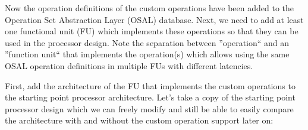 \documentclass[twoside]{tceusermanual}
\begin{document}
% 

Now the operation definitions of the custom operations have been added to the
Operation Set Abstraction Layer (OSAL) database. Next, we need to add at
least one functional unit (FU) which implements these operations so that they
can be used in the processor design. Note the separation between ''operation`` and
an ''function unit`` that implements the operation(s) which allows using the
same OSAL operation definitions in multiple FUs with different latencies.

First, add the architecture of the FU that implements the custom operations
to the starting point processor architecture. Let's take a copy of the starting
point processor design which we can freely modify and still be able to easily
compare the architecture with and without the custom operation support later on:
\end{document}

